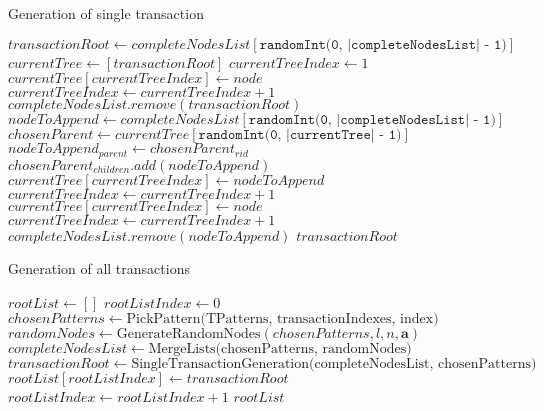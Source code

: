 \documentclass{acm_proc_article-sp-sigmod09}
\begin{document}
\begin{algorithm}
\caption{Generation of single transaction}
\label{transaction_generation}
\begin{algorithmic}[1]
\State $transactionRoot \gets completeNodesList[\texttt{randomInt(0, |completeNodesList| - 1)}]$
\State $currentTree \gets [transactionRoot]$
\State $currentTreeIndex \gets 1$
        \State $currentTree[currentTreeIndex] \gets node$
        \State $currentTreeIndex \gets currentTreeIndex + 1$
    \EndFor
\EndIf
\State $completeNodesList.remove(transactionRoot)$
    \State $nodeToAppend \gets completeNodesList[\texttt{randomInt(0, |completeNodesList| - 1)}]$
    \State $chosenParent \gets currentTree[\texttt{randomInt(0, |currentTree| - 1)}]$
    \State $nodeToAppend_{parent} \gets chosenParent_{rid}$
    \State $chosenParent_{children}.add(nodeToAppend)$
    \State $currentTree[currentTreeIndex] \gets nodeToAppend$
    \State $currentTreeIndex \gets currentTreeIndex + 1$
            \State $currentTree[currentTreeIndex] \gets node$
            \State $currentTreeIndex \gets currentTreeIndex + 1$
        \EndFor
    \EndIf
    \State $completeNodesList.remove(nodeToAppend)$
\EndFor
\Return $transactionRoot$
\EndFunction
\end{algorithmic}
\end{algorithm}

\begin{algorithm}
\caption{Generation of all transactions}
\label{complete_transaction_generation}
\begin{algorithmic}[1]
\State $rootList \gets []$
\State $rootListIndex \gets 0$
    \State $chosenPatterns \gets \text{PickPattern(TPatterns, transactionIndexes, index)}$
    \State $randomNodes \gets \text{GenerateRandomNodes}(chosenPatterns, l, n, \boldsymbol{a})$
    \State $completeNodesList \gets \text{MergeLists(chosenPatterns, randomNodes)}$
    \State $transactionRoot \gets \text{SingleTransactionGeneration(completeNodesList, chosenPatterns)}$
    \State $rootList[rootListIndex] \gets transactionRoot$
    \State $rootListIndex \gets rootListIndex + 1$
\EndFor
\Return $rootList$
\EndFunction
\end{algorithmic}
\end{algorithm}
\end{document}
